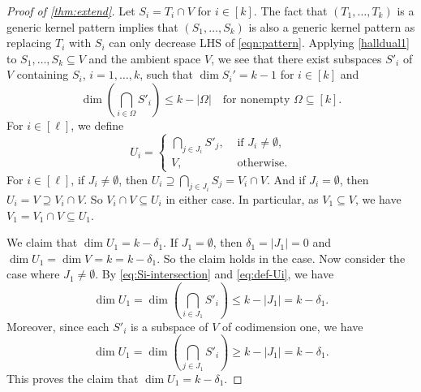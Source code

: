 \documentclass[11pt]{article}
\newif\ifmynotes
\newcommand{\ZGnote}[1]{\ifmynotes\textcolor{purple}{[Zeyu: #1]}\else\fi}
\theoremstyle{plain}
\theoremstyle{definition}
\theoremstyle{remark}
\newcommand{\spa}{\mathrm{span}}
\newcommand{\bx}{\bm{x}}
\begin{document}
\begin{proof}[Proof of \cref{thm:extend}]
Let $S_i=T_i\cap V$ for $i\in [k]$. The fact that $(T_1,\ldots,T_k)$ is a generic kernel pattern implies that $(S_1,\ldots,S_k)$ is also a generic kernel pattern as replacing $T_i$ with $S_i$ can only decrease LHS of \eqref{eqn:pattern}. %
Applying \cref{halldual1} to $S_1,\dots,S_k\subseteq V$ and the ambient space $V$,  
we see that there exist subspaces $S'_i$ of $V$ containing $S_i$, $i=1,\dots,k$, such that $\dim S_i'=k-1$ for $i\in [k]$ and
\begin{equation}\label{eq:Si-intersection}
\dim \left(\bigcap_{i\in\Omega}S'_i\right)\leq k-|\Omega| \quad \text{for nonempty } \Omega\subseteq [k].
\end{equation}
For $i\in [\ell]$, we define 
\begin{equation}\label{eq:def-Ui}
U_i=\begin{cases}\bigcap_{j\in J_i}S'_j,  & \text{ if }J_i\neq\emptyset,\\
V, & \text{ otherwise}.
\end{cases}
\end{equation}
For $i\in [\ell]$, if $J_i\neq\emptyset$, then $U_i\supseteq \bigcap_{j\in J_i} S_j=V_i\cap V$. And if $J_i=\emptyset$, then $U_i=V\supseteq V_i\cap V$. So $V_i\cap V\subseteq U_i$ in either case.
In particular, as $V_1\subseteq V$, we have $V_1=V_1\cap V\subseteq U_1$.

We claim that $\dim U_1=k-\delta_1$. 
If $J_1=\emptyset$, then $\delta_1=|J_1|=0$ and $\dim U_1=\dim V=k=k-\delta_1$. So the claim holds in the case.
Now consider the case where $J_1\neq\emptyset$.
By \eqref{eq:Si-intersection} and \eqref{eq:def-Ui}, we have 
\[
\dim U_1=\dim \left(\bigcap_{i\in J_1} S'_i\right)\leq k-|J_1| = k-\delta_1.
\]
Moreover, since each $S'_i$ is a subspace of $V$ of codimension one, we have 
\[
\dim U_1 =\dim\left(\bigcap_{j\in J_1}S'_i\right)\geq k-|J_1|=k-\delta_1.
\]
This proves the claim that $\dim U_1=k-\delta_1$. 


\end{proof}
\end{document}
